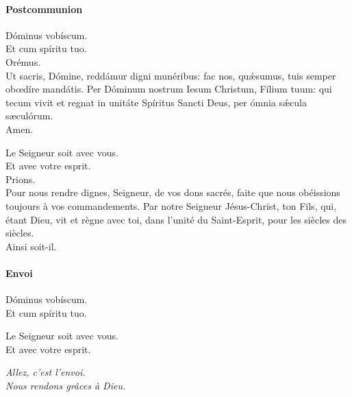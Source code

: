 \documentclass[twoside]{article}
\begin{document}
\paragraph{Postcommunion}
\begin{paracol}{2}

\vv Dóminus vobíscum.\\
\rr Et cum spíritu tuo.\\
\vv Orémus.\\
Ut sacris, Dómine, reddámur digni munéribus: fac nos, quǽsumus, tuis semper obœdíre mandátis.
Per Dóminum nostrum Iesum Christum, Fílium tuum: qui tecum vivit et regnat in unitáte Spíritus Sancti Deus, per ómnia sǽcula sæculórum.\\
\rr Amen.

\switchcolumn

\vv Le Seigneur soit avec vous.\\
\rr Et avec votre esprit.\\
\vv Prions.\\
Pour nous rendre dignes, Seigneur, de vos dons sacrés, faite que nous obéissions toujours à vos commandements.
Par notre Seigneur Jésus-Christ, ton Fils, qui, étant Dieu, vit et règne avec toi, dans l’unité du Saint-Esprit, pour les siècles des siècles.\\
\rr Ainsi soit-il.

\end{paracol}

\paragraph{Envoi}

\begin{paracol}{2}

\vv Dóminus vobíscum.\\
\rr Et cum spíritu tuo.

\switchcolumn

\vv Le Seigneur soit avec vous.\\
\rr Et avec votre esprit.

\end{paracol}


\emph{\vv Allez, c'est l'envoi.\\
\rr Nous rendons grâces à Dieu.}
\end{document}
